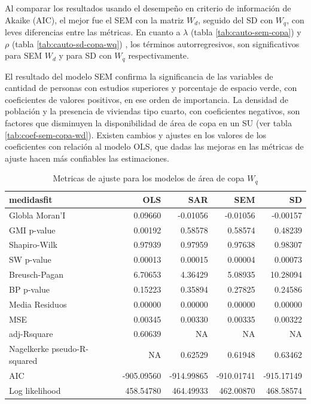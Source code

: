 \documentclass[12pt,a4paper,openany]{book}
\theoremstyle{definition}
\theoremstyle{definition}
\theoremstyle{definition}
\theoremstyle{remark}
\begin{document}
Al comparar los resultados usando el desempeño en criterio de
información de Akaike (AIC), el mejor fue el SEM con la matriz \(W_d\),
seguido del SD con \(W_q\), con leves diferencias entre las métricas. En
cuanto a \(\lambda\) (tabla \ref{tab:cauto-sem-copa}) y \(\rho\) (tabla
\ref{tab:cauto-sd-copa-wq}) , los términos autorregresivos, son
significativos para SEM \(W_d\) y para SD con \(W_q\) respectivamente.

El resultado del modelo SEM confirma la significancia de las variables
de cantidad de personas con estudios superiores y porcentaje de espacio
verde, con coeficientes de valores positivos, en ese orden de
importancia. La densidad de población y la presencia de viviendas tipo
cuarto, con coeficientes negativos, son factores que disminuyen la
disponibilidad de área de copa en un SU (ver tabla
\ref{tab:coef-sem-copa-wd}). Existen cambios y ajustes en los valores de
los coeficientes con relación al modelo OLS, que dadas las mejoras en
las métricas de ajuste hacen más confiables las estimaciones.

\begin{table}[H]

\caption{\label{tab:tabla-comp-modelos-copa-wq}Metricas de ajuste para los modelos de área de copa $W_q$}
\centering
\begin{tabular}{lrrrr}
\toprule
medidasfit & OLS & SAR & SEM & SD\\
\midrule
Globla Moran'I & 0.09660 & -0.01056 & -0.01056 & -0.00157\\
GMI p-value & 0.00192 & 0.58578 & 0.58574 & 0.48239\\
Shapiro-Wilk & 0.97939 & 0.97959 & 0.97638 & 0.98307\\
SW p-value & 0.00013 & 0.00015 & 0.00004 & 0.00073\\
Breusch-Pagan & 6.70653 & 4.36429 & 5.08935 & 10.28094\\
\addlinespace
BP p-value & 0.15223 & 0.35894 & 0.27825 & 0.24586\\
Media Residuos & 0.00000 & 0.00000 & 0.00000 & 0.00000\\
MSE & 0.00345 & 0.00330 & 0.00335 & 0.00322\\
adj-Rsquare & 0.60639 & NA & NA & NA\\
Nagelkerke pseudo-R-squared & NA & 0.62529 & 0.61948 & 0.63462\\
\addlinespace
AIC & -905.09560 & -914.99865 & -910.01741 & -915.17149\\
Log likelihood & 458.54780 & 464.49933 & 462.00870 & 468.58574\\
\bottomrule
\end{tabular}
\end{table}
\end{document}
